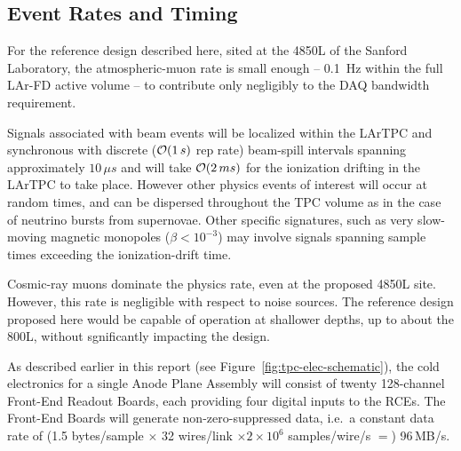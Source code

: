 
\subsection{Event Rates and Timing}
\label{sec:v5-daq-assumptions}

For the reference design described here, sited at the 4850L of the Sanford Laboratory, the 
atmospheric-muon rate is small enough -- 0.1~Hz within the full LAr-FD active 
volume -- to contribute only negligibly to the DAQ bandwidth requirement.


Signals associated with beam events will be localized within the
LArTPC and synchronous with discrete (${\cal O} (1\,s)$ rep rate)
beam-spill intervals spanning approximately $10\,\mu s$ and will take
${\cal O} (2\,ms)$ for the ionization drifting in the LArTPC to take place.
However other physics events of interest will occur at random times,
and can be dispersed throughout the TPC volume as in the case of
neutrino bursts from supernovae.  Other specific signatures, such as
very slow-moving magnetic monopoles ($\beta < 10^{-3}$) may involve
signals spanning sample times exceeding the ionization-drift time.

Cosmic-ray muons dominate the physics rate, even at the proposed 4850L
site.  However, this rate is negligible with respect to noise sources.
The reference design proposed here would be capable of operation at
shallower depths, up to about the 800L, without sgnificantly impacting
the design.

As described earlier in this report (see
Figure~\ref{fig:tpc-elec-schematic}), the cold electronics for a
single Anode Plane Assembly will consist of twenty  128-channel
Front-End Readout Boards, each providing four digital inputs to the
RCEs.  The Front-End Boards will generate non-zero-suppressed data,
i.e.\ a constant data rate of (1.5 bytes/sample $\times$ 32 wires/link
$\times 2 \times 10^6$ samples/wire/s $=$) 96\,MB/s.

